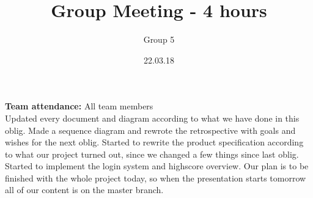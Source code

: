 \documentclass{article}
\title{Group Meeting - 4 hours}
\author{Group 5}
\date{22.03.18}
\begin{document}
	\maketitle
	\noindent
	\textbf{Team attendance:} All team members \\

	\noindent
	Updated every document and diagram according to what we have done in this oblig.
	Made a sequence diagram and rewrote the retrospective with goals and wishes for the next oblig.
	Started to rewrite the product specification according to what our project turned out, since
	we changed a few things since last oblig. Started to implement the login system and highscore overview.
	Our plan is to be finished with the whole project today, so when the presentation starts tomorrow all 
	of our content is on the master branch.
\end{document}
